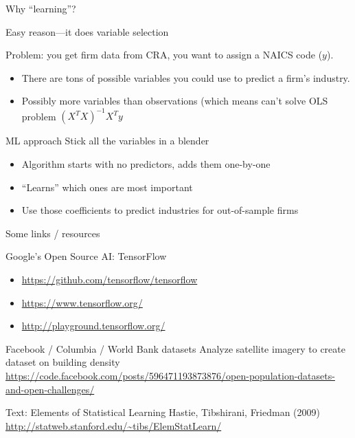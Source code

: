\documentclass[12pt]{beamer}
\begin{document}
\begin{frame}{Why ``learning''?}

\begin{block}{Easy reason---it does variable selection}

Problem: you get firm data from CRA, you want to assign a NAICS code ($y$). 

\begin{itemize}
\item There are tons of possible variables you could use to predict a firm's industry.
\item Possibly more variables than observations (which means can't solve OLS problem $(X^T X)^{-1} X^T y$
\end{itemize}

\end{block}

\begin{block}{ML approach}
Stick all the variables in a blender
\begin{itemize}
\item Algorithm starts with no predictors, adds them one-by-one 
\item ``Learns'' which ones are most important 
\item Use those coefficients to predict industries for out-of-sample firms
\end{itemize}

\end{block}

\end{frame}

\begin{frame}{Some links / resources}

\begin{block}{Google's Open Source AI: TensorFlow}
\begin{itemize}
\item \url{https://github.com/tensorflow/tensorflow}
\item \url{https://www.tensorflow.org/}
\item \url{http://playground.tensorflow.org/}
\end{itemize}
\end{block}

\begin{block}{Facebook / Columbia / World Bank datasets}
Analyze satellite imagery to create dataset on building density
\url{https://code.facebook.com/posts/596471193873876/open-population-datasets-and-open-challenges/}
\end{block}

\begin{block}{Text: Elements of Statistical Learning}
Hastie, Tibshirani, Friedman (2009)
\url{http://statweb.stanford.edu/~tibs/ElemStatLearn/}
\end{block}




\end{frame}
\end{document}
